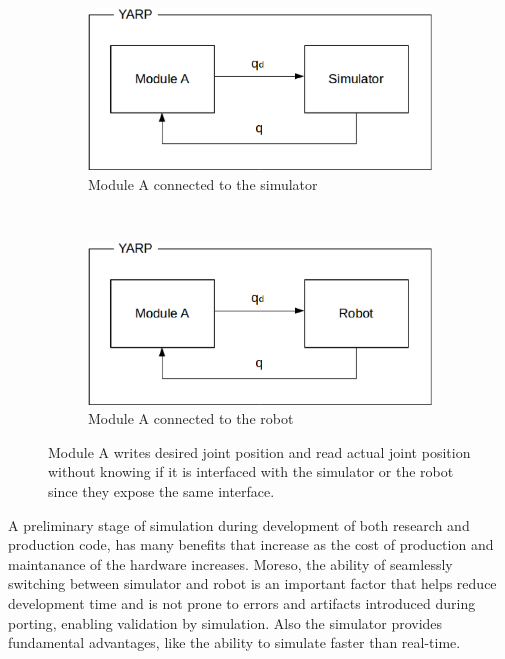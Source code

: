 \begin{figure}
        \centering
        \begin{subfigure}[b]{0.45\textwidth}
                \includegraphics[width=\textwidth]{images/yarp_simulation_a.eps}
                \caption{Module A connected to the simulator}
                \label{yarp_simulation_a}
        \end{subfigure}%
        \\
        \begin{subfigure}[b]{0.45\textwidth}
                \includegraphics[width=\textwidth]{images/yarp_simulation_b.eps}
                \caption{Module A connected to the robot}
                \label{yarp_simulation_b}
        \end{subfigure}
        \caption{Module A writes desired joint position and read actual joint position without knowing if it is interfaced with the simulator or the robot since they expose the same interface.}\label{yarp_simulation}
\end{figure}

A preliminary stage of simulation during development of both research and production code, has many benefits that increase as the cost of production and maintanance of the hardware increases. Moreso, the ability of seamlessly switching between simulator and robot is an important factor that helps reduce development time and is not prone to errors and artifacts introduced during porting, enabling validation by simulation.
Also the simulator provides fundamental advantages, like the ability to simulate faster than real-time.

